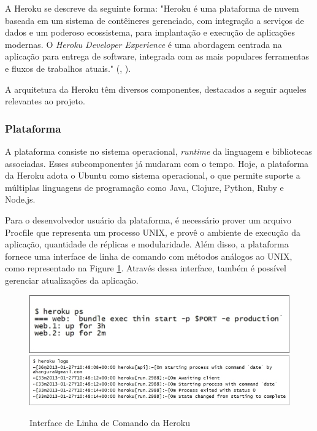 	        A Heroku se descreve da seguinte forma: "Heroku é uma plataforma de nuvem baseada em um sistema de contêineres gerenciado, com integração a serviços de dados e um poderoso ecossistema, para implantação e execução de aplicações modernas. O \textit{Heroku Developer Experience} é uma abordagem centrada na aplicação para entrega de software, integrada com as mais populares ferramentas e fluxos de trabalhos atuais." (\citeauthor{herokuplatform}, \citeyear{herokuplatform}).
	        
	        A arquitetura da Heroku têm diversos componentes, destacados a seguir aqueles relevantes ao projeto.
	        \subsubsection{Plataforma}
	            A plataforma consiste no sistema operacional, \textit{runtime} da linguagem e bibliotecas associadas. Esses subcomponentes já mudaram com o tempo. Hoje, a plataforma da Heroku adota o Ubuntu como sistema operacional, o que permite suporte a múltiplas linguagens de programação como Java, Clojure, Python, Ruby e Node.js.\cite{herokucloud}
	            
	            Para o desenvolvedor usuário da plataforma, é necessário prover um arquivo Procfile que representa um processo UNIX, e provê o ambiente de execução da aplicação, quantidade de réplicas e modularidade. Além disso, a plataforma fornece uma interface de linha de comando com métodos análogos ao UNIX, como representado na Figure \ref{fig:herokucli}. Através dessa interface, também é possível gerenciar atualizações da aplicação.\cite{herokucloud}
        	    \begin{figure}[htb]
            	    \centering
            	    \caption{Interface de Linha de Comando da Heroku}
            	    \includegraphics[scale=0.75]{pictures/especificacao-de-projeto/heroku-ps.jpg}
            	    \includegraphics[scale=0.75]{pictures/especificacao-de-projeto/heroku-logs.jpg}
            	    \label{fig:herokucli}
        	    \end{figure}
        	    
